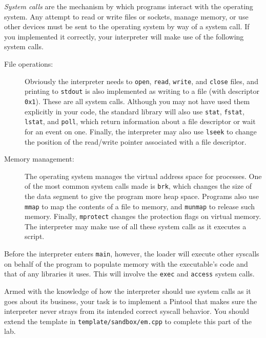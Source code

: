 \documentclass[11pt]{article}
\begin{document}
\emph{System calls} are the mechanism by which programs interact with the operating system. Any attempt to read or write files or sockets, manage memory, or use other devices must be sent to the operating system by way of a system call. If you implemented it correctly, your interpreter will make use of the following system calls.
\begin{description}
\item[File operations:] Obviously the interpreter needs to \verb'open', \verb'read', \verb'write', and \verb'close' files, and printing to \verb'stdout' is also implemented as writing to a file (with descriptor \verb'0x1'). These are all system calls. Although you may not have used them explicitly in your code, the standard library will also use \verb'stat', \verb'fstat', \verb'lstat', and \verb'poll', which return information about a file descriptor or wait for an event on one. Finally, the interpreter may also use \verb'lseek' to change the position of the read/write pointer associated with a file descriptor.

\item[Memory management:] The operating system manages the virtual address space for processes. One of the most common system calls made is \verb'brk', which changes the size of the data segment to give the program more heap space. Programs also use \verb'mmap' to map the contents of a file to memory, and \verb'munmap' to release such memory. Finally, \verb'mprotect' changes the protection flags on virtual memory. The interpreter may make use of all these system calls as it executes a script.
\end{description}
Before the interpreter enters \verb'main', however, the loader will execute other syscalls on behalf of the program to populate memory with the executable's code and that of any libraries it uses. This will involve the \verb'exec' and \verb'access' system calls.

Armed with the knowledge of how the interpreter should use system calls as it goes about its business, your task is to implement a Pintool that makes sure the interpreter never strays from its intended correct syscall behavior. You should extend the template in \verb'template/sandbox/em.cpp' to complete this part of the lab.
\end{document}
